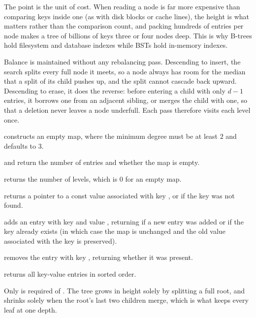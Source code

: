 The point is the unit of cost. When reading a node is far more expensive than comparing keys inside one (as with disk blocks or cache lines), the height is what matters rather than the comparison count, and packing hundreds of entries per node makes a tree of billions of keys three or four nodes deep. This is why B-trees hold filesystem and database indexes while BSTs hold in-memory indexes.

Balance is maintained without any rebalancing pass. Descending to insert, the search splits every full node it meets, so a node always has room for the median that a split of its child pushes up, and the split cannot cascade back upward. Descending to erase, it does the reverse: before entering a child with only $d - 1$ entries, it borrows one from an adjacent sibling, or merges the child with one, so that a deletion never leaves a node underfull. Each pass therefore visits each level once.

\begin{compactitem}
  \item {} constructs an empty map, where the minimum degree must be at least $2$ and defaults to $3$.
  \item {} and  return the number of entries and whether the map is empty.
  \item {} returns the number of levels, which is $0$ for an empty map.
  \item {} returns a pointer to a const value associated with key , or  if the key was not found.
  \item {} adds an entry with key  and value , returning  if a new entry was added or  if the key already exists (in which case the map is unchanged and the old value associated with the key is preserved).
  \item {} removes the entry with key , returning whether it was present.
  \item {} returns all key-value entries in sorted order.
\end{compactitem}

Only  is required of . The tree grows in height solely by splitting a full root, and shrinks solely when the root's last two children merge, which is what keeps every leaf at one depth.

